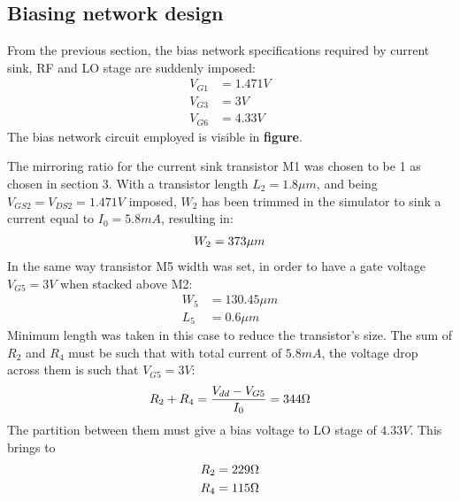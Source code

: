 \subsection{Biasing network design}                                              
From the previous section, the bias network specifications required by current sink, RF and LO stage are suddenly imposed:
\begin{align}                                                                    
	V_{G1}&=1.471 V \nonumber \\                                                    
	V_{G3}&=3 V \nonumber \\                                                        
	V_{G6}&=4.33 V \nonumber                                                        
\end{align}                                                                      
The bias network circuit employed is visible in \textbf{figure}. 
               
The mirroring ratio for the current sink transistor M1 was chosen to be 1 as chosen in section 3. With a transistor length \(L_2 = 1.8\mu m\), and being \(V_{GS2}=V_{DS2}=1.471V\) imposed, \(W_2\) has been trimmed in the simulator to sink a current equal to \(I_0=5.8mA\), resulting in:
\begin{align}
W_2=373\mu m \notag
\end{align} 
In the same way transistor M5 width was set, in order to have a gate voltage \(V_{G5}=3V\) when stacked above M2:
\begin{align}
	W_5&=130.45\mu m \nonumber\\
	L_5&=0.6\mu m \nonumber
\end{align}
Minimum length was taken in this case to reduce the transistor's size.
The sum of \(R_2\) and \(R_4\) must be such that with total current of \(5.8mA\), the voltage drop across them is such that \(V_{G5}=3V\):
\begin{align}
	R_2+R_4=\frac{V_{dd}-V_{G5}}{I_0} = 344\ohm \nonumber
\end{align}
The partition between them must give a bias voltage to LO stage of \(4.33V\). This brings to
\begin{align}
	R_2=229\ohm\nonumber\\
	R_4=115\ohm\nonumber
\end{align}

